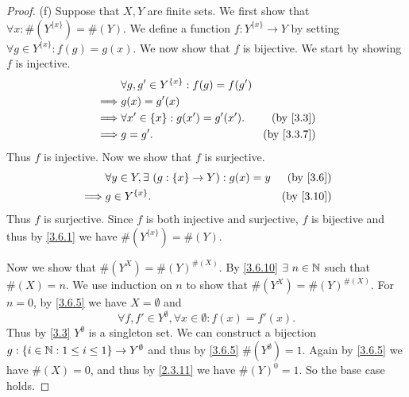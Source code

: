 \begin{proof}{(f)}
  Suppose that \(X, Y\) are finite sets.
  We first show that \(\forall x : \#(Y^{\{x\}}) = \#(Y)\).
  We define a function \(f : Y^{\{x\}} \to Y\) by setting \(\forall g \in Y^{\{x\}} : f(g) = g(x)\).
  We now show that \(f\) is bijective.
  We start by showing \(f\) is injective.
  \begin{align*}
             & \forall g, g' \in Y^{\{x\}} : f(g) = f(g')                            \\
    \implies & g(x) = g'(x)                                                          \\
    \implies & \forall x' \in \{x\} : g(x') = g'(x').     & \text{(by \cref{3.3})}   \\
    \implies & g = g'.                                    & \text{(by \cref{3.3.7})}
  \end{align*}
  Thus \(f\) is injective.
  Now we show that \(f\) is surjective.
  \begin{align*}
             & \forall y \in Y, \exists\ (g : \{x\} \to Y) : g(x) = y & \text{(by \cref{3.6})}  \\
    \implies & g \in Y^{\{x\}}.                                       & \text{(by \cref{3.10})}
  \end{align*}
  Thus \(f\) is surjective.
  Since \(f\) is both injective and surjective, \(f\) is bijective and thus by \cref{3.6.1} we have \(\#(Y^{\{x\}}) = \#(Y)\).

  Now we show that \(\#(Y^X) = \#(Y)^{\#(X)}\).
  By \cref{3.6.10} \(\exists\ n \in \N\) such that \(\#(X) = n\).
  We use induction on \(n\) to show that \(\#(Y^X) = \#(Y)^{\#(X)}\).
  For \(n = 0\), by \cref{3.6.5} we have \(X = \emptyset\) and
  \[
    \forall f, f' \in Y^\emptyset, \forall x \in \emptyset : f(x) = f'(x).
  \]
  Thus by \cref{3.3} \(Y^\emptyset\) is a singleton set.
  We can construct a bijection \(g : \{i \in \mathbb{N} : 1 \leq i \leq 1\} \to Y^\emptyset\) and thus by \cref{3.6.5} \(\#(Y^\emptyset) = 1\).
  Again by \cref{3.6.5} we have \(\#(X) = 0\), and thus by \cref{2.3.11} we have \(\#(Y)^0 = 1\).
  So the base case holds.


\end{proof}
